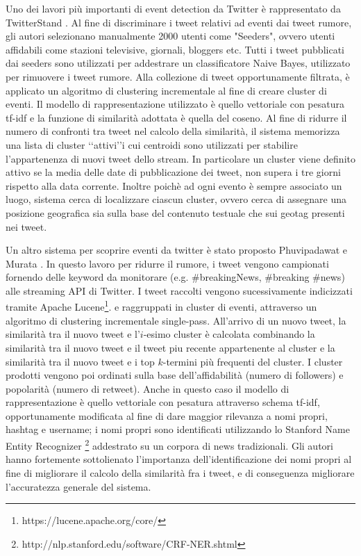 Uno dei lavori più importanti di event detection da Twitter è rappresentato da TwitterStand \cite{Sankaranarayanan:2009:TNT:1653771.1653781}. 
Al fine di discriminare i tweet relativi ad eventi dai tweet rumore, gli autori selezionano manualmente 2000 utenti come "Seeders", ovvero utenti affidabili come stazioni televisive, giornali, bloggers etc. Tutti i tweet pubblicati dai seeders sono utilizzati per addestrare un classificatore Naive Bayes, utilizzato per rimuovere i tweet rumore.
Alla collezione di tweet opportunamente filtrata, è applicato un algoritmo di clustering incrementale al fine di creare cluster di eventi. Il modello di rappresentazione utilizzato è quello vettoriale con pesatura tf-idf e la funzione di similarità adottata è quella del coseno. 
Al fine di ridurre il numero di confronti tra tweet nel calcolo della similarità, il sistema memorizza una lista di cluster \lq\lq attivi\rq\rq i cui centroidi sono utilizzati per stabilire l'appartenenza di nuovi tweet dello stream. In particolare un cluster viene definito attivo se la media delle date di pubblicazione dei tweet, non supera i tre giorni rispetto alla data corrente. 
Inoltre poichè ad ogni evento è sempre associato un luogo, sistema cerca di localizzare ciascun cluster, ovvero cerca di assegnare una posizione geografica sia sulla base del contenuto testuale che sui geotag presenti nei tweet.

Un altro sistema per scoprire eventi da twitter è stato proposto Phuvipadawat e Murata \cite{Phuvipadawat:2010:BND:1913791.1913911}. In questo lavoro per ridurre il rumore, i tweet vengono campionati %
 fornendo delle keyword da monitorare  (e.g. \#breakingNews, \#breaking \#news) alle streaming API di Twitter. I tweet raccolti vengono sucessivamente indicizzati tramite Apache Lucene\footnote{https://lucene.apache.org/core/}. e raggruppati in cluster di eventi, attraverso un algoritmo di clustering incrementale single-pass. All'arrivo di un nuovo tweet, la similarità tra il nuovo tweet e l'$i$-esimo cluster è calcolata combinando la similarità tra il nuovo tweet e il tweet piu recente appartenente al cluster e la similarità tra il nuovo tweet e i top $k$-termini più frequenti del cluster. I cluster prodotti vengono poi ordinati sulla base dell'affidabilità (numero di followers) e popolarità (numero di retweet).
Anche in questo caso il modello di rappresentazione è quello vettoriale con pesatura attraverso schema tf-idf, opportunamente modificata al fine di dare maggior rilevanza a nomi propri, hashtag e username; i nomi propri sono identificati utilizzando lo Stanford Name Entity Recognizer \footnote{http://nlp.stanford.edu/software/CRF-NER.shtml} addestrato su un corpora di news tradizionali.
Gli autori hanno fortemente sottolienato l'importanza dell'identificazione dei nomi propri al fine di migliorare il calcolo della similarità fra i tweet, e di conseguenza migliorare l'accuratezza generale del sistema.


